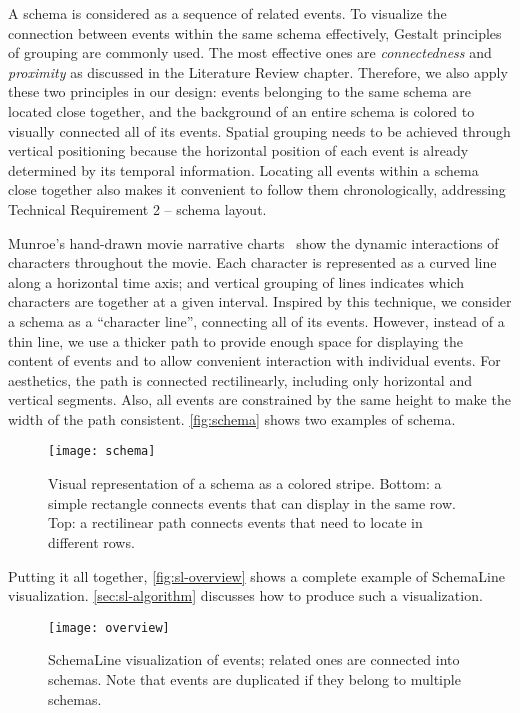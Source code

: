 A schema is considered as a sequence of related events. To visualize the connection between events within the same schema effectively, Gestalt principles of grouping are commonly used. The most effective ones are \emph{connectedness} and \emph{proximity} as discussed in the Literature Review chapter. Therefore, we also apply these two principles in our design: events belonging to the same schema are located close together, and the background of an entire schema is colored to visually connected all of its events. Spatial grouping needs to be achieved through vertical positioning because the horizontal position of each event is already determined by its temporal information. Locating all events within a schema close together also makes it convenient to follow them chronologically, addressing Technical Requirement 2 -- schema layout.

Munroe's hand-drawn movie narrative charts~\cite{Munroe2009} show the dynamic interactions of characters throughout the movie. Each character is represented as a curved line along a horizontal time axis; and vertical grouping of lines indicates which characters are together at a given interval. Inspired by this technique, we consider a schema as a ``character line'', connecting all of its events. However, instead of a thin line, we use a thicker path to provide enough space for displaying the content of events and to allow convenient interaction with individual events. For aesthetics, the path is connected rectilinearly, including only horizontal and vertical segments. Also, all events are constrained by the same height to make the width of the path consistent. \autoref{fig:schema} shows two examples of schema.

\begin{figure}
	\centering
	\texttt{[image: schema]}
	\caption[Visual representation of a schema]{Visual representation of a schema as a colored stripe. Bottom: a simple rectangle connects events that can display in the same row. Top: a rectilinear path connects events that need to locate in different rows.}
	\label{fig:schema}
\end{figure}

Putting it all together, \autoref{fig:sl-overview} shows a complete example of SchemaLine visualization. \autoref{sec:sl-algorithm} discusses how to produce such a visualization.

\begin{figure}
	\centering
	\texttt{[image: overview]}
	\caption[SchemaLine visualization of events]{SchemaLine visualization of events; related ones are connected into schemas. Note that events are duplicated if they belong to multiple schemas.}
	\label{fig:sl-overview}
\end{figure}

